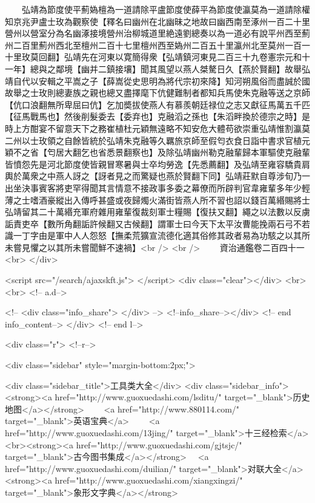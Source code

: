 　　弘靖為節度使平薊媯檀為一道請除平盧節度使薛平為節度使瀛莫為一道請除權知京兆尹盧士玫為觀察使【釋名曰幽州在北幽昧之地故曰幽西南至涿州一百二十里營州以營室分為名幽涿接境營州治柳城道里絶遠劉總奏以為一道必有說平州西至薊州二百里薊州西北至檀州二百十七里檀州西至媯州二百五十里瀛州北至莫州一百一十里玫莫回翻】弘靖先在河東以寛簡得衆【弘靖鎮河東見二百三十九卷憲宗元和十一年】總與之鄰境【幽并二鎮接壤】聞其風望以燕人桀驁日久【燕於賢翻】故舉弘靖自代以安輯之平嵩之子【薛嵩從史思明為將代宗初來降】知河朔風俗而盡誠於國故舉之士玫則總妻族之親也總又盡擇麾下伉健難制者都知兵馬使朱克融等送之京師【伉口浪翻無所卑屈曰伉】乞加奬拔使燕人有慕羨朝廷禄位之志又獻征馬萬五千匹【征馬戰馬也】然後削髮委去【委弃也】克融滔之孫也【朱滔畔換於德宗之時】是時上方酣宴不留意天下之務崔植杜元穎無遠略不知安危大體苟欲崇重弘靖惟割瀛莫二州以士玫領之自餘皆統於弘靖朱克融等久羈旅京師至假匄衣食日詣中書求官植元穎不之省【匄居大翻乞也省悉景翻察也】及除弘靖幽州勒克融輩歸本軍驅使克融輩皆憤怨先是河北節度使皆親冒寒暑與士卒均勞逸【先悉薦翻】及弘靖至雍容驕貴肩輿於萬衆之中燕人訝之【訝者見之而驚疑也燕於賢翻下同】弘靖莊默自尊涉旬乃一出坐決事賓客將吏罕得聞其言情意不接政事多委之幕僚而所辟判官韋雍輩多年少輕薄之士嗜酒豪縱出入傳呼甚盛或夜歸燭火滿街皆燕人所不習也詔以錢百萬緡賜將士弘靖留其二十萬緡充軍府雜用雍輩復裁刻軍士糧賜【復扶又翻】繩之以法數以反虜詬責吏卒【數所角翻詬許候翻又古候翻】謂軍士曰今天下太平汝曹能挽兩石弓不若識一丁字由是軍中人人怨怒【撫柔荒獷宣流德化適其俗修其政者易為功駭之以其所未嘗見懼之以其所未嘗聞鮮不速禍】<br />
<br />
　　資治通鑑卷二百四十一  <br>
   </div> 

<script src="/search/ajaxskft.js"> </script>
 <div class="clear"></div>
<br>
<br>
 <!-- a.d-->

 <!--
<div class="info_share">
</div> 
-->
 <!--info_share--></div>   <!-- end info_content-->
  </div> <!-- end l-->

<div class="r">   <!--r-->



<div class="sidebar"  style="margin-bottom:2px;">

 
<div class="sidebar_title">工具类大全</div>
<div class="sidebar_info">
<strong><a href="http://www.guoxuedashi.com/lsditu/" target="_blank">历史地图</a></strong>　　
<a href="http://www.880114.com/" target="_blank">英语宝典</a>　　
<a href="http://www.guoxuedashi.com/13jing/" target="_blank">十三经检索</a>　
<br><strong><a href="http://www.guoxuedashi.com/gjtsjc/" target="_blank">古今图书集成</a></strong>　
<a href="http://www.guoxuedashi.com/duilian/" target="_blank">对联大全</a>　<strong><a href="http://www.guoxuedashi.com/xiangxingzi/" target="_blank">象形文字典</a></strong>　


